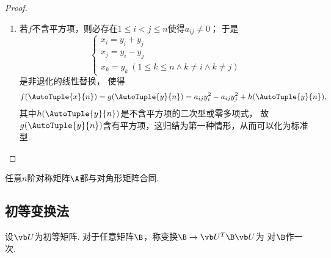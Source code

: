 \begin{theorem}
\begin{proof}
\begin{enumerate}
\item 若\(f\)不含平方项，则必存在\(1 \leq i < j \leq n\)使得\(a_{ij}\neq0\)；
于是\[
	\left\{ \begin{array}{l}
		x_i = y_i + y_j \\
		x_j = y_i - y_j \\
		x_k = y_k\ (1 \leq k \leq n \land k \neq i \land k \neq j)
	\end{array} \right.
\]是非退化的线性替换，
使得\[
	f(\AutoTuple{x}{n})
	= g(\AutoTuple{y}{n})
	= a_{ij} y_i^2 - a_{ij} y_j^2 + h(\AutoTuple{y}{n}),
\]
其中\(h(\AutoTuple{y}{n})\)是不含平方项的二次型或零多项式，
故\(g(\AutoTuple{y}{n})\)含有平方项，这归结为第一种情形，从而可以化为标准型.
\qedhere
\end{enumerate}
\end{proof}
\end{theorem}

\begin{corollary}
任意\(n\)阶对称矩阵\(\A\)都与对角形矩阵合同.
\end{corollary}

\subsection{初等变换法}
\begin{definition}
设\(\P\)为初等矩阵.
对于任意矩阵\(\B\)，称变换\(\B \to \P^T\B\P\)为
对\(\B\)作一次.
\end{definition}

